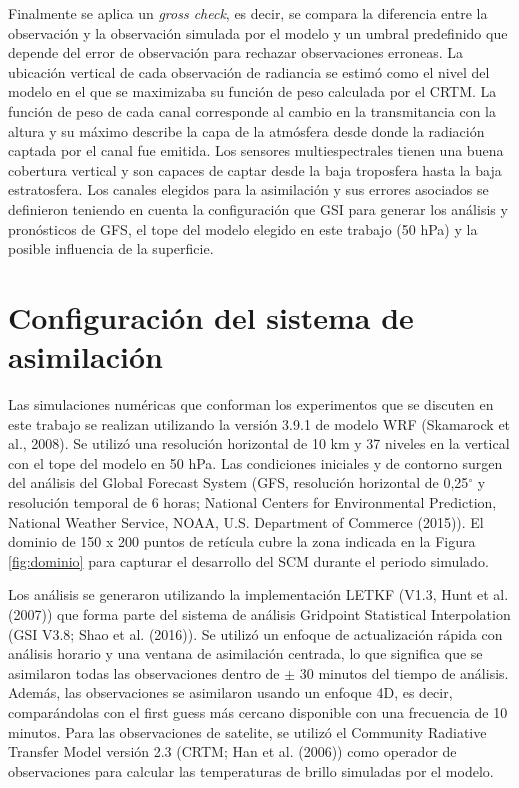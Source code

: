 \documentclass[12pt,oneside]{reedthesis}
\begin{document}
Finalmente se aplica un \emph{gross check}, es decir, se compara la diferencia entre la observación y la observación simulada por el modelo y un umbral predefinido que depende del error de observación para rechazar observaciones erroneas. La ubicación vertical de cada observación de radiancia se estimó como el nivel del modelo en el que se maximizaba su función de peso calculada por el CRTM. La función de peso de cada canal corresponde al cambio en la transmitancia con la altura y su máximo describe la capa de la atmósfera desde donde la radiación captada por el canal fue emitida. Los sensores multiespectrales tienen una buena cobertura vertical y son capaces de captar desde la baja troposfera hasta la baja estratosfera. Los canales elegidos para la asimilación y sus errores asociados se definieron teniendo en cuenta la configuración que GSI para generar los análisis y pronósticos de GFS, el tope del modelo elegido en este trabajo (50 hPa) y la posible influencia de la superficie.

\hypertarget{configmodelo}{%
\section{Configuración del sistema de asimilación}\label{configmodelo}}

Las simulaciones numéricas que conforman los experimentos que se discuten en este trabajo se realizan utilizando la versión 3.9.1 de modelo WRF (Skamarock et al., 2008).
Se utilizó una resolución horizontal de 10 km y 37 niveles en la vertical con el tope del modelo en 50 hPa.
Las condiciones iniciales y de contorno surgen del análisis del Global Forecast System (GFS, resolución horizontal de 0,25\(^{\circ}\) y resolución temporal de 6 horas; National Centers for Environmental Prediction, National Weather Service, NOAA, U.S. Department of Commerce (2015)).
El dominio de 150 x 200 puntos de retícula cubre la zona indicada en la Figura \ref{fig:dominio} para capturar el desarrollo del SCM durante el periodo simulado.

Los análisis se generaron utilizando la implementación LETKF (V1.3, Hunt et al. (2007)) que forma parte del sistema de análisis Gridpoint Statistical Interpolation (GSI V3.8; Shao et al. (2016)).
Se utilizó un enfoque de actualización rápida con análisis horario y una ventana de asimilación centrada, lo que significa que se asimilaron todas las observaciones dentro de \(\pm\) 30 minutos del tiempo de análisis.
Además, las observaciones se asimilaron usando un enfoque 4D, es decir, comparándolas con el first guess más cercano disponible con una frecuencia de 10 minutos.
Para las observaciones de satelite, se utilizó el Community Radiative Transfer Model versión 2.3 (CRTM; Han et al. (2006)) como operador de observaciones para calcular las temperaturas de brillo simuladas por el modelo.
\end{document}
